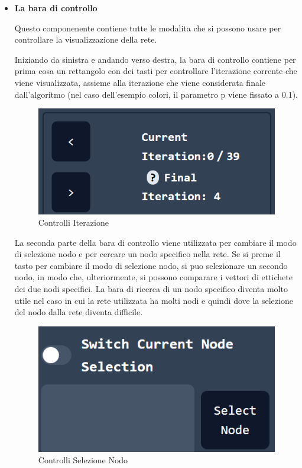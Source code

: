 \documentclass[a4paper,12pt]{report}
\begin{document}
			\begin{itemize}
			\item \textbf{La bara di controllo} 

			Questo componenente contiene tutte le modalita che si possono usare per controllare la visualizzazione della rete. 

			Iniziando da sinistra e andando verso destra, la bara di controllo contiene per prima cosa un rettangolo con dei tasti per controllare l'iterazione corrente che viene visualizzata, assieme alla iterazione che viene considerata finale dall'algoritmo (nel caso dell'esempio colori, il parametro p viene fissato a 0.1). \par
			\begin{center}
			\begin{figure}[H]
			\centering
			\includegraphics[width=0.8\linewidth,keepaspectratio]{iterationcontrol}
			\caption{Controlli Iterazione}
			\end{figure}
			\end{center}

			La seconda parte della bara di controllo viene utilizzata per cambiare il modo di selezione nodo e per cercare un nodo specifico nella rete. Se si preme il tasto per cambiare il modo di selezione nodo, si puo selezionare un secondo nodo, in modo che, ulteriormente, si possono comparare i vettori di ettichete dei due nodi specifici. La bara di ricerca di un nodo specifico diventa molto utile nel caso in cui la rete utilizzata ha molti nodi e quindi dove la selezione del nodo dalla rete diventa difficile. \par
			\begin{center}
			\begin{figure}[H]
			\centering
			\includegraphics[width=0.8\linewidth,keepaspectratio]{nodeselection}
			\caption{Controlli Selezione Nodo}
			\end{figure}
			\end{center}


\end{itemize}
\end{document}
